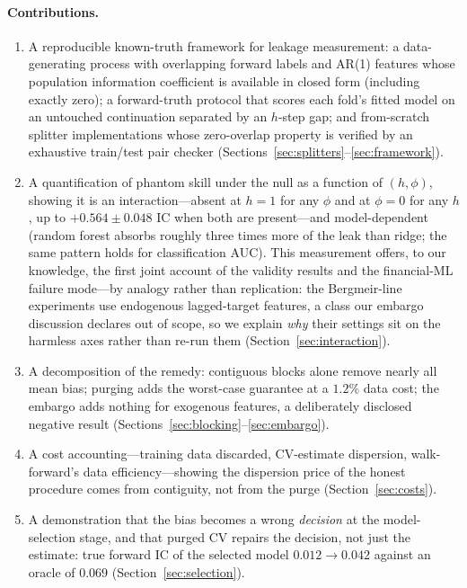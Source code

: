 \documentclass[11pt]{article}
\begin{document}
\paragraph{Contributions.}
\begin{enumerate}\itemsep2pt
\item A reproducible known-truth framework for leakage measurement: a
data-generating process with overlapping forward labels and AR(1) features
whose population information coefficient is available in closed form
(including exactly zero); a forward-truth protocol that scores each fold's
fitted model on an untouched continuation separated by an $h$-step gap; and
from-scratch splitter implementations whose zero-overlap property is verified
by an exhaustive train/test pair checker (Sections~\ref{sec:splitters}--\ref{sec:framework}).
\item A quantification of phantom skill under the null as a function of
$(h,\phi)$, showing it is an interaction---absent at $h=1$ for any $\phi$ and
at $\phi=0$ for any $h$, up to $+0.564\pm0.048$ IC when both are present---and
model-dependent (random forest absorbs roughly three times more of the leak
than ridge; the same pattern holds for classification AUC). This measurement
offers, to our knowledge, the first joint account of the
\citet{bergmeir2018note} validity results and the financial-ML failure
mode---by analogy rather than replication: the Bergmeir-line experiments use
endogenous lagged-target features, a class our embargo discussion declares
out of scope, so we explain \emph{why} their settings sit on the harmless
axes rather than re-run them (Section~\ref{sec:interaction}).
\item A decomposition of the remedy: contiguous blocks alone remove nearly all
mean bias; purging adds the worst-case guarantee at a $1.2\%$ data cost; the
embargo adds nothing for exogenous features, a deliberately disclosed negative
result (Sections~\ref{sec:blocking}--\ref{sec:embargo}).
\item A cost accounting---training data discarded, CV-estimate dispersion,
walk-forward's data efficiency---showing the dispersion price of the honest
procedure comes from contiguity, not from the purge
(Section~\ref{sec:costs}).
\item A demonstration that the bias becomes a wrong \emph{decision} at the
model-selection stage, and that purged CV repairs the decision, not just the
estimate: true forward IC of the selected model $0.012 \to 0.042$ against an
oracle of $0.069$ (Section~\ref{sec:selection}).
\end{enumerate}
\end{document}
